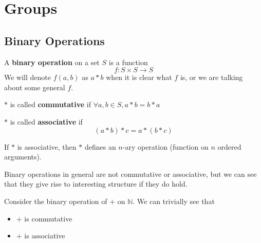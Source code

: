 \documentclass{report}
\begin{document}
\chapter{Groups}

\section{Binary Operations}

\begin{definition}
    A \textbf{binary operation} on a set $S$ is a function
    \begin{equation*}
        f: S \times S \rightarrow S
    \end{equation*}
    We will denote $f(a, b)$ as $a * b$ when it is clear what $f$ is, or we are talking about some general $f$.
\end{definition}

\begin{definition}
    $*$ is called \textbf{commutative} if $\forall a,b \in S, a * b = b* a$
\end{definition}


\begin{definition}
    $*$ is called \textbf{associative} if \begin{equation*}
        (a * b) * c = a * (b * c)
    \end{equation*}
\end{definition}

\begin{remark}
    If $*$ is associative, then $*$ defines an $n$-ary operation (function on $n$ ordered arguments).
\end{remark}

Binary operations in general are not commutative or associative, but we can see that they give rise to interesting structure if they do hold.


\begin{example}
    Consider the binary operation of $+$ on $\mathbb{N}$. We can trivially see that
    \begin{itemize}
        \item $+$ is commutative
        \item $+$ is associative
    \end{itemize}
\end{example}
\end{document}
